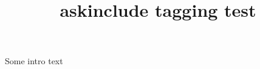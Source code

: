 \documentclass{report}
\title{askinclude tagging test}
\begin{document}
Some intro text


\end{document}
